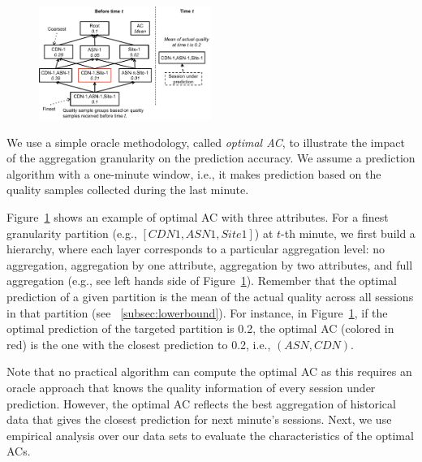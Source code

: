 \begin{figure}[h!]
\centering
 \includegraphics[width=0.5\textwidth] {figures/fig-optimal-AC.pdf}
\label{fig:example-optimal-ac}
\end{figure}

 We use a simple oracle methodology, called {\it optimal AC}, to illustrate the impact of the aggregation granularity on the prediction accuracy. We assume a prediction algorithm with a one-minute window, i.e., it makes prediction based on the quality samples collected during the last minute.

Figure~\ref{fig:example-optimal-ac} shows an example of optimal AC
with three attributes. For a finest granularity partition (e.g.,
$[CDN1,ASN1,Site1]$) at $t$-th minute, we first build a hierarchy,
where each layer corresponds to a particular aggregation level: no
aggregation, aggregation by one attribute, aggregation by two
attributes, and full aggregation (e.g., see left hands side of
Figure~\ref{fig:example-optimal-ac}).  Remember that the optimal
prediction of a given partition is the mean of the actual quality
across all sessions in that partition (see
\Section~\ref{subsec:lowerbound}).  
For instance, in Figure~\ref{fig:example-optimal-ac}, if the optimal
prediction of the targeted partition is 0.2, the optimal AC (colored
in red) is the one with the closest prediction to 0.2, i.e., $(ASN,
CDN)$.

Note that no practical algorithm can compute the optimal AC as this
requires an oracle approach that knows the quality information of
every session under prediction. However, the optimal AC reflects the
best aggregation of historical data that gives the closest prediction
for next minute's sessions. Next, we use empirical analysis over our
data sets to evaluate the characteristics of the optimal ACs.

